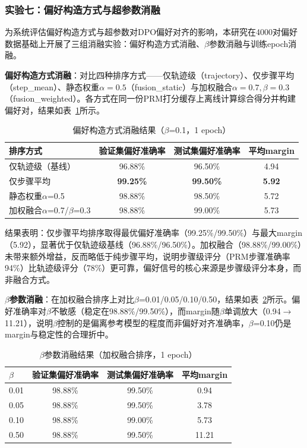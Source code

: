 \documentclass[professional,privacy,print,win,long,STEM,AutoFakeBold]{def/buaa}
\begin{document}
\subsubsection{实验七：偏好构造方式与超参数消融}

为系统评估偏好构造方式与超参数对DPO偏好对齐的影响，本研究在4000对偏好数据基础上开展了三组消融实验：偏好构造方式消融、$\beta$参数消融与训练epoch消融。

\textbf{偏好构造方式消融}：对比四种排序方式——仅轨迹级（trajectory）、仅步骤平均（step\_mean）、静态权重$\alpha=0.5$（fusion\_static）与加权融合$\alpha=0.7,\beta=0.3$（fusion\_weighted）。各方式在同一份PRM打分缓存上离线计算综合得分并构建偏好对，结果如表~\ref{tab:abl-ranking}所示。

\begin{table}[h]
\centering
\caption{偏好构造方式消融结果（$\beta$=0.1，1 epoch）}
\label{tab:abl-ranking}
\begin{tabular}{lccc}
\toprule
排序方式 & 验证集偏好准确率 & 测试集偏好准确率 & 平均margin \\
\midrule
仅轨迹级（基线） & 96.88\% & 96.50\% & 4.94 \\
仅步骤平均 & \textbf{99.25\%} & \textbf{99.50\%} & \textbf{5.92} \\
静态权重$\alpha$=0.5 & 98.88\% & 98.50\% & 5.72 \\
加权融合$\alpha$=0.7/$\beta$=0.3 & 98.88\% & 99.00\% & 5.73 \\
\bottomrule
\end{tabular}
\end{table}

结果表明：仅步骤平均排序取得最优偏好准确率（99.25\%/99.50\%）与最大margin（5.92），显著优于仅轨迹级基线（96.88\%/96.50\%）。加权融合（98.88\%/99.00\%）未带来额外增益，反而略低于纯步骤平均，说明步骤级评分（PRM步骤准确率94\%）比轨迹级评分（78\%）更可靠，偏好信号的核心来源是步骤级评分本身，而非融合方式。

\textbf{$\beta$参数消融}：在加权融合排序上对比$\beta$=0.01/0.05/0.10/0.50，结果如表~\ref{tab:abl-beta}所示。偏好准确率对$\beta$不敏感（稳定在98.88\%/99.50\%），而margin随$\beta$单调放大（0.94$\rightarrow$11.21），说明$\beta$控制的是偏离参考模型的程度而非偏好对齐准确率，$\beta$=0.10仍是margin与稳定性的合理折中。

\begin{table}[h]
\centering
\caption{$\beta$参数消融结果（加权融合排序，1 epoch）}
\label{tab:abl-beta}
\begin{tabular}{lccc}
\toprule
$\beta$ & 验证集偏好准确率 & 测试集偏好准确率 & 平均margin \\
\midrule
0.01 & 98.88\% & 99.50\% & 0.94 \\
0.05 & 98.88\% & 99.50\% & 3.78 \\
0.10 & 98.88\% & 99.00\% & 5.73 \\
0.50 & 98.88\% & 99.50\% & 11.21 \\
\bottomrule
\end{tabular}
\end{table}
\end{document}
